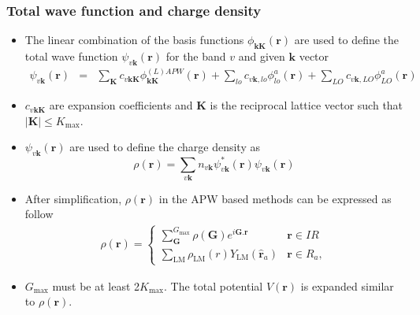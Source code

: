 \documentclass[10pt, handout]{beamer}
\newcommand{\br}{\bm{r}}
\newcommand{\bK}{\bm{K}}
\newcommand{\bk}{\bm{k}}
\newcommand{\bG}{\bm{G}}
\newcommand{\nologo}{\setbeamertemplate{logo}{}}  %
\begin{document}

{\nologo
		\begin{frame}
				\frametitle{Total wave function and charge density}
		\small{		
					\begin{itemize}
							\item The linear combination of the basis functions $\phi_{\textbf{kK}}(\br)$ are used to define the total wave function $\psi_{v\bk}(\br)$ for the band $v$ and given $\bk$ vector
							\begin{eqnarray}\nonumber
									\psi_{v\bk}(\br) &=& \sum_{\bK} c_{v\bk\bK} \phi^{(L)APW}_{\bk\bK}(\br) + \sum_{lo} c_{v\bk,lo} \phi_{lo}^a(\br) + \sum_{LO} c_{v\bk,LO} \phi_{LO}^a(\br)
								\end{eqnarray}
							\item $c_{v\bk\bK}$ are expansion coefficients and $\bK$ is the reciprocal lattice vector such that $|\bK| \le K_{\text{max}}$.
							\item $\psi_{v\bk}(\br)$ are used to define the charge density as 
							$$\rho(\br) = \sum_{v\bk}n_{v\bk} 	\psi_{v\bk}^{*}(\br) \psi_{v\bk}(\br)$$
							\item After simplification, $\rho(\br)$ in the APW based methods can be expressed as follow
							\begin{eqnarray}\nonumber
									\rho(\br) = \begin{cases}
											\sum_{\bG}^{G_{\text{max}}} \rho(\bG) e^{i\bG.\br}    & \br \in IR   \\
											\sum_{\text{LM}} \rho_{\text{LM}}(r) Y_{\text{LM}}(\hat{\br}_a)   & \br \in R_a, 		   
										\end{cases}
								\end{eqnarray}
							\item $G_{\text{max}}$ must be at least 2$K_{\text{max}}$. The total potential $V(\br)$ is expanded similar to $\rho(\br)$.
						\end{itemize}
			}	
			\end{frame}
	}

\end{document}
